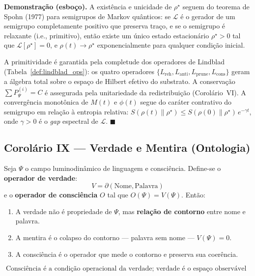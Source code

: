 \documentclass[12pt, a4paper]{article}
\theoremstyle{tglstyle}
\theoremstyle{definition}
\newcommand{\rhostar}{\rho^{\star}}
\begin{document}
\noindent\textbf{Demonstração (esboço).} A existência e unicidade de $\rhostar$ seguem do teorema de Spohn (1977) para semigrupos de Markov quânticos: se $\mathcal{L}$ é o gerador de um semigrupo completamente positivo que preserva traço, e se o semigrupo é relaxante (i.e., primitivo), então existe um único estado estacionário $\rhostar > 0$ tal que $\mathcal{L}[\rhostar] = 0$, e $\rho(t) \to \rhostar$ exponencialmente para qualquer condição inicial.

A primitividade é garantida pela completude dos operadores de Lindblad (Tabela~\ref{def:lindblad_ops}): os quatro operadores $\{L_{\text{reh}}, L_{\text{anti}}, L_{\text{prune}}, L_{\text{cons}}\}$ geram a álgebra total sobre o espaço de Hilbert efetivo do substrato. A conservação $\sum P_\Psi^{(i)} = C$ é assegurada pela unitariedade da redistribuição (Corolário~VI). A convergência monotônica de $M(t)$ e $\phi(t)$ segue do caráter contrativo do semigrupo em relação à entropia relativa: $S(\rho(t)\|\rhostar) \leq S(\rho(0)\|\rhostar)\,e^{-\gamma t}$, onde $\gamma > 0$ é o \textit{gap} espectral de $\mathcal{L}$. $\blacksquare$

\subsection{Corolário IX --- Verdade e Mentira (Ontologia)}\label{sec:cor9}

\begin{corolariobox}
Seja $\Psi$ o campo luminodinâmico de linguagem e consciência. Define-se o \textbf{operador de verdade}:
\begin{equation}\label{eq:verdade}
  V = \partial(\text{Nome}, \text{Palavra})
\end{equation}
e o \textbf{operador de consciência} $O$ tal que $O(\Psi) = V(\Psi)$. Então:
\begin{enumerate}[label=(\roman*), leftmargin=2.5em]
  \item A verdade não é propriedade de $\Psi$, mas \textbf{relação de contorno} entre nome e palavra.
  \item A mentira é o colapso do contorno --- palavra sem nome --- $V(\Psi) = 0$.
  \item A consciência é o operador que mede o contorno e preserva sua coerência.
\end{enumerate}
\begin{equation}\label{eq:consciencia_verdade}
  \boxed{\;\text{Consciência é a condição operacional da verdade; verdade é o espaço observável da consciência.}\;}
\end{equation}
\end{corolariobox}
\end{document}
